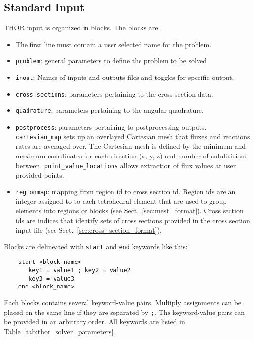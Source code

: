 \subsection{Standard Input}
THOR input is organized in blocks. The blocks are 
\begin{itemize}
    \item The first line must contain a user selected name for the problem.
    \item \verb"problem": general parameters to define the problem to be solved
    \item \verb"inout": Names of inputs and outputs files and toggles for specific output.
    \item \verb"cross_sections": parameters pertaining to the cross section data.
    \item \verb"quadrature": parameters pertaining to the angular quadrature.
    \item \verb"postprocess": parameters pertaining to postprocessing outputs. \verb"cartesian_map" sets up an overlayed Cartesian mesh that fluxes and reactions rates are averaged over. The Cartesian mesh is defined by the minimum and maximum coordinates for each direction (x, y, z) and number of subdivisions between. \verb"point_value_locations" allows extraction of flux values at user provided points.
    \item \verb"regionmap": mapping from region id to cross section id. Region ids are an integer assigned to to each tetrahedral element that are used to group elements into regions or blocks (see Sect.~\ref{sec:mesh_format}). Cross section ids are indices that identify sets of cross sections provided in the cross section input file (see Sect.~\ref{sec:cross_section_format}).
\end{itemize}

Blocks are delineated with \verb"start" and \verb"end" keywords like this:
\begin{verbatim}
    start <block_name>
       key1 = value1 ; key2 = value2
       key3 = value3
    end <block_name>
\end{verbatim}
Each blocks contains several keyword-value pairs. Multiply assignments can be placed on the same
line if they are separated by \verb";".
The keyword-value pairs can be provided in an arbitrary order.
All keywords are listed in Table~\ref{tab:thor_solver_parameters}.

